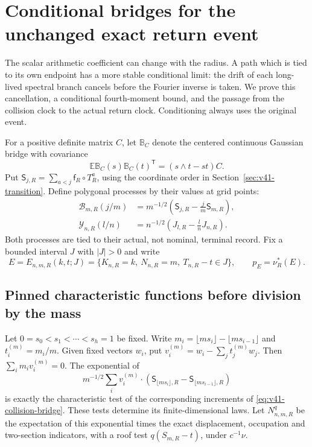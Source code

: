 \section{Conditional bridges for the unchanged exact return event}
\label{sec:v41-bridges}
The scalar arithmetic coefficient can change with the radius. A path
which is tied to its own endpoint has a more stable conditional limit:
the drift of each long-lived spectral branch cancels before the Fourier
inverse is taken. We prove this cancellation, a conditional fourth-moment
bound, and the passage from the collision clock to the actual return
clock. Conditioning always uses the original event.

For a positive definite matrix $C$, let $\mathbb B_C$ denote the
centered continuous Gaussian bridge with covariance
\[
 \mathbb E\mathbb B_C(s)\mathbb B_C(t)^{\mathsf T}
                         =(s\wedge t-st)C.
\]
Put $\mathsf S_{j,R}=\sum_{a<j}\mathsf f_R\circ T_R^a$, using the
coordinate order in Section~\ref{sec:v41-transition}. Define polygonal
processes by their values at grid points:
\begin{align}
 \mathcal B_{m,R}(j/m)
    &=m^{-1/2}\left(\mathsf S_{j,R}-\frac jm\mathsf S_{m,R}\right),
                                      \label{eq:v41-collision-bridge}\\
 \mathcal Y_{n,R}(l/n)
    &=n^{-1/2}\left(J_{l,R}-\frac ln J_{n,R}\right).
                                      \label{eq:v41-return-bridge}
\end{align}
Both processes are tied to their actual, not nominal, terminal record.
Fix a bounded interval $J$ with $|J|>0$ and write
\begin{equation}\label{eq:v41-exact-conditioning}
 E=E_{n,m,R}(k,t;J)
   =\{K_{n,R}=k,\ N_{n,R}=m,\ T_{n,R}-t\in J\},
 \qquad p_E=\nu_R^*(E).
\end{equation}

\subsection{Pinned characteristic functions before division by the mass}
Let $0=s_0<s_1<\cdots<s_h=1$ be fixed. Write
$m_i=\lfloor ms_i\rfloor-\lfloor ms_{i-1}\rfloor$ and
$t_i^{(m)}=m_i/m$. Given fixed vectors $w_i$, put
$v_i^{(m)}=w_i-\sum_jt_j^{(m)}w_j$. Then
$\sum_i m_i v_i^{(m)}=0$. The exponential of
\[
 m^{-1/2}\sum_i v_i^{(m)}\cdot
    (\mathsf S_{\lfloor ms_i\rfloor,R}
                  -\mathsf S_{\lfloor ms_{i-1}\rfloor,R})
\]
is exactly the characteristic test of the corresponding increments
of \eqref{eq:v41-collision-bridge}. These tests determine its
finite-dimensional laws. Let $N^q_{n,m,R}$ be the expectation of this
exponential times the exact displacement, occupation and two-section
indicators, with a roof test $q(S_{m,R}-t)$, under $c^{-1}\nu$.


